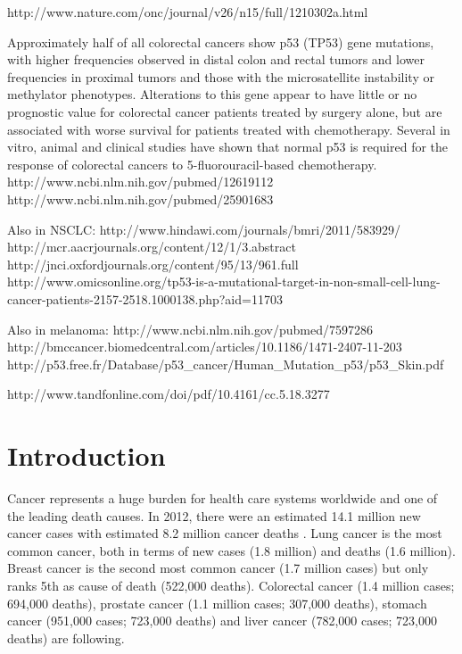 http://www.nature.com/onc/journal/v26/n15/full/1210302a.html

Approximately half of all colorectal cancers show p53
(TP53) gene mutations, with higher frequencies observed in distal colon
and rectal tumors and lower frequencies in proximal tumors and those with
the microsatellite instability or methylator phenotypes. Alterations to
this gene appear to have little or no prognostic value for colorectal
cancer patients treated by surgery alone, but are associated with worse
survival for patients treated with chemotherapy. Several in vitro, animal
and clinical studies have shown that normal p53 is required for the
response of colorectal cancers to 5-fluorouracil-based chemotherapy.
http://www.ncbi.nlm.nih.gov/pubmed/12619112
http://www.ncbi.nlm.nih.gov/pubmed/25901683

Also in NSCLC: http://www.hindawi.com/journals/bmri/2011/583929/
http://mcr.aacrjournals.org/content/12/1/3.abstract
http://jnci.oxfordjournals.org/content/95/13/961.full
http://www.omicsonline.org/tp53-is-a-mutational-target-in-non-small-cell-lung-cancer-patients-2157-2518.1000138.php?aid=11703


Also in melanoma: http://www.ncbi.nlm.nih.gov/pubmed/7597286
http://bmccancer.biomedcentral.com/articles/10.1186/1471-2407-11-203
http://p53.free.fr/Database/p53_cancer/Human_Mutation_p53/p53_Skin.pdf





http://www.tandfonline.com/doi/pdf/10.4161/cc.5.18.3277


















\section{Introduction}

  Cancer represents a huge burden for health care systems worldwide and one of
  the leading death causes. In 2012, there were an estimated 14.1 million new
  cancer cases with estimated  8.2 million cancer deaths
  {\cite{cancer_stats_worldwide:2012}}. Lung cancer is the most common cancer,
  both in terms of new cases (1.8 million) and deaths (1.6 million). Breast
  cancer is the second most common cancer (1.7 million cases) but only ranks 5th
  as cause of death (522,000 deaths). Colorectal cancer (1.4 million cases;
  694,000 deaths), prostate cancer (1.1 million cases; 307,000 deaths), stomach
  cancer (951,000 cases; 723,000 deaths) and liver cancer (782,000 cases;
  723,000 deaths) are following.

